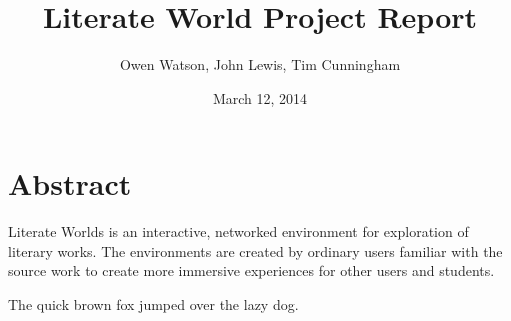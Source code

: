\documentclass[12pt, letterpaper]{report}
\author{Owen Watson, John Lewis, Tim Cunningham}
\title{Literate World Project Report}
\date{March 12, 2014}
\begin{document}
	\begin{titlepage}
	\Huge \maketitle \par
	\end{titlepage}
	
	\part{Abstract}
	Literate Worlds is an interactive, networked environment for exploration of literary works. The environments are created by ordinary users familiar with the source work to create more immersive experiences for other users and students. \par
	The quick brown fox jumped over the lazy dog.
	


	
	
\end{document}

